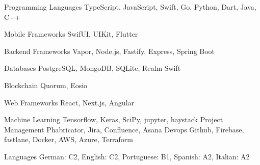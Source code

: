 

\begin{cvskills}

\cvskill
{Programming Languages} %
{TypeScript, JavaScript, Swift, Go, Python, Dart, Java, C++} %
\vspace{0.4cm}

\cvskill
{Mobile Frameworks} %
{SwifUI, UIKit, Flutter} %
\vspace{0.4cm}

\cvskill
{Backend Frameworks} %
{Vapor, Node.js, Fastify, Express, Spring Boot} %
\vspace{0.4cm}

\cvskill
{Databases} %
{PostgreSQL, MongoDB, SQLite, Realm Swift} %
\vspace{0.4cm}

\cvskill
{Blockchain} %
{Quorum, Eosio} %
\vspace{0.4cm}

\cvskill
{Web Frameworks} %
{React, Next.js, Angular} %
\vspace{0.4cm}

\cvskill
{Machine Learning} %
{Tensorflow, Keras, SciPy, jupyter, haystack} %
\vspace{0.4cm}
\cvskill
{Project Management} %
{Phabricator, Jira, Confluence, Asana} %
\vspace{0.4cm}
\cvskill
{Devops} %
{Github, Firebase, fastlane, Docker, AWS, Azure, Terraform} %
\vspace{0.4cm}


\cvskill
{Languages} %
{German: C2, English: C2, Portuguese: B1, Spanish: A2, Italian: A2} %


\end{cvskills}